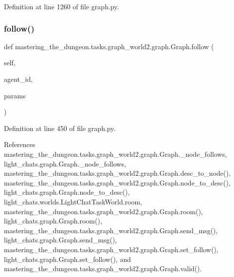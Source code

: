 Definition at line 1260 of file graph.\+py.

\mbox{\label{classmastering__the__dungeon_1_1tasks_1_1graph__world2_1_1graph_1_1Graph_aa15fc9576acfd82be1d58fd75e42c746}} 
\subsubsection{\texorpdfstring{follow()}{follow()}}
{\footnotesize\ttfamily def mastering\+\_\+the\+\_\+dungeon.\+tasks.\+graph\+\_\+world2.\+graph.\+Graph.\+follow (\begin{DoxyParamCaption}\item[{}]{self,  }\item[{}]{agent\+\_\+id,  }\item[{}]{params }\end{DoxyParamCaption})}



Definition at line 450 of file graph.\+py.



References mastering\+\_\+the\+\_\+dungeon.\+tasks.\+graph\+\_\+world2.\+graph.\+Graph.\+\_\+node\+\_\+follows, light\+\_\+chats.\+graph.\+Graph.\+\_\+node\+\_\+follows, mastering\+\_\+the\+\_\+dungeon.\+tasks.\+graph\+\_\+world2.\+graph.\+Graph.\+desc\+\_\+to\+\_\+node(), mastering\+\_\+the\+\_\+dungeon.\+tasks.\+graph\+\_\+world2.\+graph.\+Graph.\+node\+\_\+to\+\_\+desc(), light\+\_\+chats.\+graph.\+Graph.\+node\+\_\+to\+\_\+desc(), light\+\_\+chats.\+worlds.\+Light\+Chat\+Task\+World.\+room, mastering\+\_\+the\+\_\+dungeon.\+tasks.\+graph\+\_\+world2.\+graph.\+Graph.\+room(), light\+\_\+chats.\+graph.\+Graph.\+room(), mastering\+\_\+the\+\_\+dungeon.\+tasks.\+graph\+\_\+world2.\+graph.\+Graph.\+send\+\_\+msg(), light\+\_\+chats.\+graph.\+Graph.\+send\+\_\+msg(), mastering\+\_\+the\+\_\+dungeon.\+tasks.\+graph\+\_\+world2.\+graph.\+Graph.\+set\+\_\+follow(), light\+\_\+chats.\+graph.\+Graph.\+set\+\_\+follow(), and mastering\+\_\+the\+\_\+dungeon.\+tasks.\+graph\+\_\+world2.\+graph.\+Graph.\+valid().



